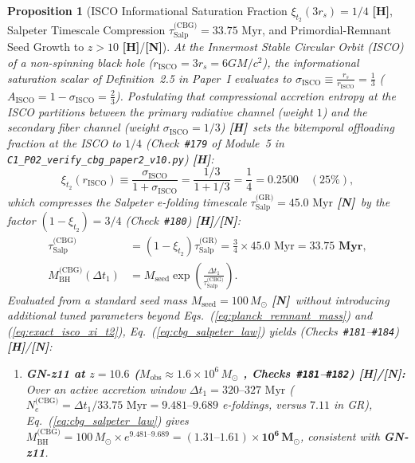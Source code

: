 \documentclass[11pt,a4paper]{article}
\newcommand{\catH}{\textbf{\textcolor{orange!85!black}{[H]}}}
\newcommand{\catN}{\textbf{\textcolor{teal!75!black}{[N]}}}
\theoremstyle{plain}
\newtheorem{proposition}[theorem]{Proposition}
\theoremstyle{definition}
\theoremstyle{remark}
\numberwithin{equation}{section}
\begin{document}
\begin{proposition}[ISCO Informational Saturation Fraction $\xi_{t_2}(3r_s) = 1/4$ \catH, Salpeter Timescale Compression $\tau_{\text{Salp}}^{\text{(CBG)}} = 33.75\text{ Myr}$, and Primordial-Remnant Seed Growth to $z > 10$ \catH/\catN]
\label{prop:isco_salpeter_compression}
At the Innermost Stable Circular Orbit (ISCO) of a non-spinning black hole ($r_{\text{ISCO}} = 3r_s = 6GM/c^2$), the informational saturation scalar of Definition~2.5 in \textit{Paper~I} \cite{jimenez2026a} evaluates to $\sigma_{\text{ISCO}} \equiv \frac{r_s}{r_{\text{ISCO}}} = \frac{1}{3}$ ($A_{\text{ISCO}} = 1 - \sigma_{\text{ISCO}} = \frac{2}{3}$). Postulating that compressional accretion entropy at the ISCO partitions between the primary radiative channel (weight $1$) and the secondary fiber channel (weight $\sigma_{\text{ISCO}} = 1/3$) \catH\ sets the bitemporal offloading fraction at the ISCO to $1/4$ (Check~\texttt{\#179} of Module~5 in \allowbreak\texttt{C1\_P02\_verify\_cbg\_paper2\_v10.py}) \catH:
\begin{equation}
  \xi_{t_2}\!\left(r_{\text{ISCO}}\right) \equiv \frac{\sigma_{\text{ISCO}}}{1 + \sigma_{\text{ISCO}}} = \frac{1/3}{1 + 1/3} = \frac{1}{4} = \mathbf{0.2500} \quad (25\%),
  \label{eq:exact_isco_xi_t2}
\end{equation}
which compresses the Salpeter e-folding timescale $\tau_{\text{Salp}}^{\text{(GR)}} = 45.0\text{ Myr}$ \catN\ by the factor $(1 - \xi_{t_2}) = 3/4$ (Check~\texttt{\#180}) \catH/\catN:
\begin{align}
\tau_{\text{Salp}}^{\text{(CBG)}} &= \left(1 - \xi_{t_2}\right) \tau_{\text{Salp}}^{\text{(GR)}} = \frac{3}{4} \times 45.0\text{ Myr} = \mathbf{33.75\text{ Myr}}, \nonumber \\[3pt]
M_{\text{BH}}^{\text{(CBG)}}(\Delta t_1) &= M_{\text{seed}} \exp\!\left( \frac{\Delta t_1}{\tau_{\text{Salp}}^{\text{(CBG)}}} \right).
\label{eq:cbg_salpeter_law}
\end{align}
Evaluated from a standard seed mass $M_{\text{seed}} = 100\,M_\odot$ \catN\ without introducing additional tuned parameters beyond Eqs.~(\ref{eq:planck_remnant_mass}) and (\ref{eq:exact_isco_xi_t2}), Eq.~(\ref{eq:cbg_salpeter_law}) yields (Checks~\texttt{\#181}--\texttt{\#184}) \catH/\catN:
\begin{enumerate}
  \item[\textnormal{(i)}] \textbf{GN-z11 at $z = 10.6$ ($M_{\text{obs}} \approx 1.6 \times 10^6\,M_\odot$ \cite{maiolino2024}, Checks~\texttt{\#181}--\texttt{\#182}) \catH/\catN:} Over an active accretion window $\Delta t_1 = 320\text{--}327\text{ Myr}$ ($N_e^{\text{(CBG)}} = \Delta t_1 / 33.75\text{ Myr} = 9.481\text{--}9.689$ e-foldings, versus $7.11$ in GR), Eq.~(\ref{eq:cbg_salpeter_law}) gives $M_{\text{BH}}^{\text{(CBG)}} = 100\,M_\odot \times e^{9.481\text{--}9.689} = \mathbf{(1.31\text{--}1.61) \times 10^6\,M_\odot}$, consistent with \textbf{GN-z11}.

\end{enumerate}
\end{proposition}
\end{document}
